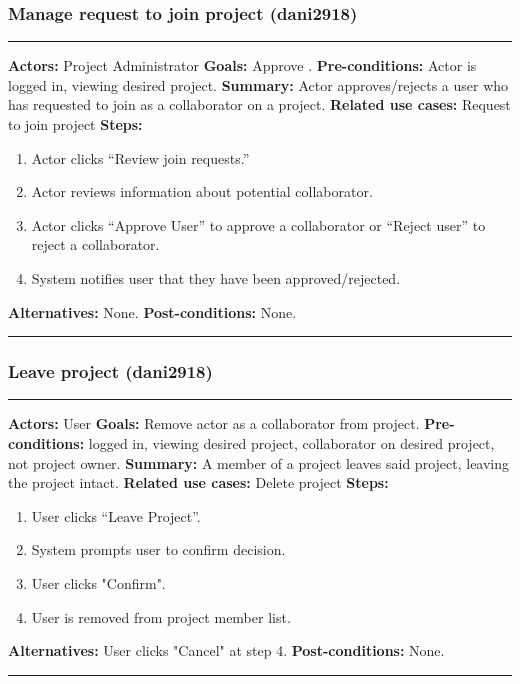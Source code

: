 \documentclass[11pt]{report}
\begin{document}
\subsubsection{Manage request to join project (dani2918)}
\vspace{2pt}
\hrule
\vspace{8pt}
 \textbf{Actors:} Project Administrator \newline
\textbf{Goals:} Approve . \newline
 \textbf{Pre-conditions:} Actor is logged in, viewing desired project.  \newline
\textbf{Summary:} Actor approves/rejects a user who has requested to join as a collaborator on a project.\newline
\textbf{Related use cases:} Request to join project \newline
\textbf{Steps:} \begin{enumerate}
  \item Actor clicks ``Review join requests.''
  \item Actor reviews information about potential collaborator.
  \item Actor clicks ``Approve User'' to approve a collaborator or ``Reject user'' to reject a collaborator.
  \item System notifies user that they have been approved/rejected.
 \end{enumerate}
 \textbf{Alternatives:} None. \newline
 \textbf{Post-conditions:} None. \newline
\vspace{8pt}
\hrule
\newpage

\subsubsection{Leave project (dani2918)}
\vspace{2pt}
\hrule
\vspace{8pt}
 \textbf{Actors:} User \newline
\textbf{Goals:} Remove actor as a collaborator from project. \newline
 \textbf{Pre-conditions:} logged in, viewing desired project, collaborator on desired project, not project owner.  \newline
\textbf{Summary:} A member of a project leaves said project, leaving the project intact. \newline
\textbf{Related use cases:} Delete project \newline
\textbf{Steps:} \begin{enumerate}
  \item User clicks ``Leave Project''.
  \item System prompts user to confirm decision.
  \item User clicks "Confirm".
  \item User is removed from project member list.
 \end{enumerate}
 \textbf{Alternatives:} User clicks "Cancel" at step 4. \newline
 \textbf{Post-conditions:} None. \newline
\vspace{8pt}
\hrule
\newpage
\end{document}
